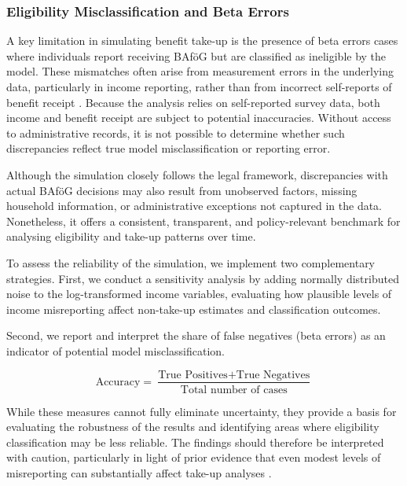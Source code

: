
\subsubsection{Eligibility Misclassification and Beta Errors}
A key limitation in simulating benefit take-up is the presence of beta errors cases where individuals report receiving BAföG but are classified as ineligible by the model. 
These mismatches often arise from measurement errors in the underlying data, particularly in income reporting, rather than from incorrect self-reports of benefit receipt \citep{frick_claim_2007, janssens_takemod_2022}. 
Because the analysis relies on self-reported survey data, both income and benefit receipt are subject to potential inaccuracies. 
Without access to administrative records, it is not possible to determine whether such discrepancies reflect true model misclassification or reporting error.

Although the simulation closely follows the legal framework, discrepancies with actual BAföG decisions may also result from unobserved factors, missing household information, or administrative exceptions not captured in the data. Nonetheless, it offers a consistent, transparent, and policy-relevant benchmark for analysing eligibility and take-up patterns over time.

To assess the reliability of the simulation, we implement two complementary strategies. 
First, we conduct a sensitivity analysis by adding normally distributed noise to the log-transformed income variables, evaluating how plausible levels of income misreporting affect non-take-up estimates and classification outcomes. 

Second, we report and interpret the share of false negatives (beta errors) as an indicator of potential model misclassification.

\begin{equation} \label{eq:accuracy_microsimulation}
    \text{Accuracy} = \frac{\text{True Positives} + \text{True Negatives}}{\text{Total number of cases}}
\end{equation}

While these measures cannot fully eliminate uncertainty, they provide a basis for evaluating the robustness of the results and identifying areas where eligibility classification may be less reliable. The findings should therefore be interpreted with caution, particularly in light of prior evidence that even modest levels of misreporting can substantially affect take-up analyses \citep{pudney_impact_2001}.


